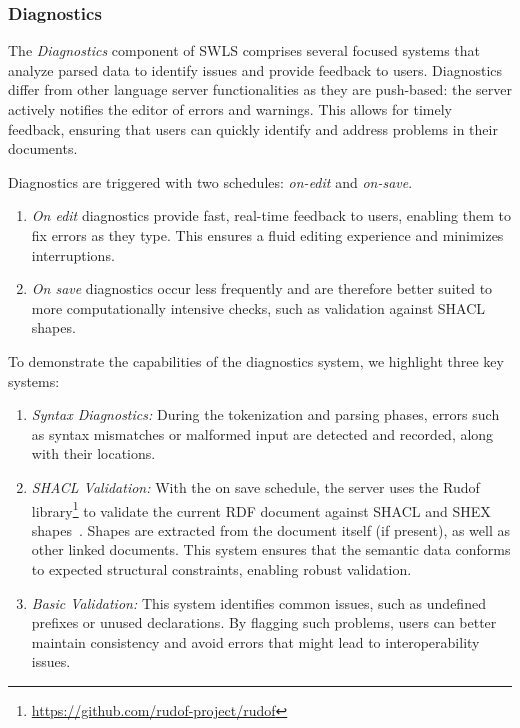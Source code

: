 \subsubsection{Diagnostics}

The \textit{Diagnostics} component of SWLS comprises several focused systems that analyze parsed data to identify issues and provide feedback to users.
Diagnostics differ from other language server functionalities as they are push-based: the server actively notifies the editor of errors and warnings.
This allows for timely feedback, ensuring that users can quickly identify and address problems in their documents.

Diagnostics are triggered with two schedules: \textit{on-edit} and \textit{on-save}.

\begin{enumerate}
  \item \textit{On edit} diagnostics provide fast, real-time feedback to users, enabling them to fix errors as they type. 
    This ensures a fluid editing experience and minimizes interruptions.
  \item \textit{On save} diagnostics occur less frequently and are therefore better suited to more computationally intensive checks,
   such as validation against SHACL shapes.
\end{enumerate}

To demonstrate the capabilities of the diagnostics system, we highlight three key systems:

\begin{enumerate}
  \item \textit{Syntax Diagnostics:}
    During the tokenization and parsing phases, errors such as syntax mismatches or malformed input are detected and recorded, along with their locations.
  \item \textit{SHACL Validation:} 
    With the on save schedule, the server uses the Rudof library\footnote{\url{https://github.com/rudof-project/rudof}} to validate the current RDF document against SHACL and SHEX shapes~\cite{labra2022rudof}.
    Shapes are extracted from the document itself (if present), as well as other linked documents.
    This system ensures that the semantic data conforms to expected structural constraints, enabling robust validation.
  \item \textit{Basic Validation:}
    This system identifies common issues, such as undefined prefixes or unused declarations.
    By flagging such problems, users can better maintain consistency and avoid errors that might lead to interoperability issues.
\end{enumerate}

